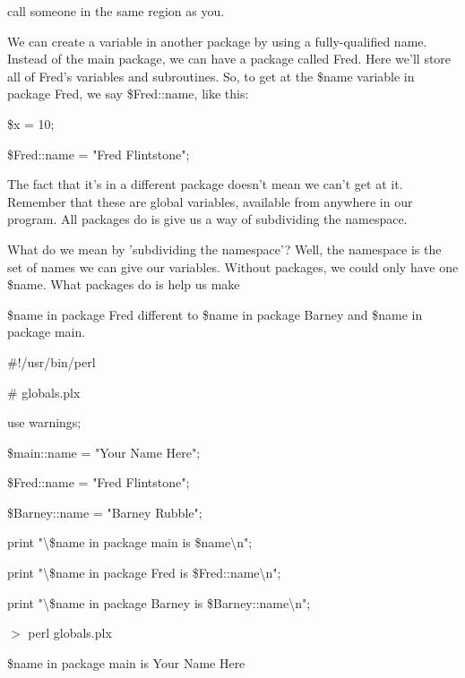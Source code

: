 \documentclass[a4paper,11pt]{book}
\begin{document}
\noindent call someone in the same region as you.

\noindent 

\noindent We can create a variable in another package by using a fully-qualified name. Instead of the main package, we can have a package called Fred. Here we'll store all of Fred's variables and subroutines. So, to get at the \$name variable in package Fred, we say \$Fred::name, like this:

\noindent 

\noindent \$x = 10;

\noindent \$Fred::name = "Fred Flintstone";

\noindent 

\noindent The fact that  it's in a different  package  doesn't  mean  we can't  get at  it.  Remember  that  these  are global variables,  available from  anywhere  in  our  program.  All  packages  do  is  give us  a  way  of subdividing the namespace.

\noindent 

\noindent What do we mean by 'subdividing the namespace'? Well, the namespace is the set of names we can give our variables. Without packages, we could only have one \$name. What packages do is help us make

\noindent \$name in package Fred different to \$name in package Barney and \$name in package main.

\noindent 

\noindent \#!/usr/bin/perl

\noindent \# globals.plx

\noindent use warnings;

\noindent \$main::name = "Your Name Here";

\noindent \$Fred::name = "Fred Flintstone";

\noindent \$Barney::name = "Barney Rubble";

\noindent 

\noindent print "\textbackslash \$name in package main is \$name\textbackslash n";

\noindent print "\textbackslash \$name in package Fred is \$Fred::name\textbackslash n";

\noindent print "\textbackslash \$name in package Barney is \$Barney::name\textbackslash n";

\noindent 

\noindent $>$ perl globals.plx

\noindent \$name in package main   is Your Name Here
\end{document}
